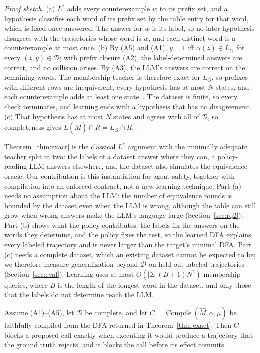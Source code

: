 \begin{proof}[Proof sketch]
(a) $L^*$ adds every counterexample $w$ to its prefix set, and a hypothesis classifies each word of its prefix set by the table entry for that word, which is fixed once answered. The answer for $w$ is its label, so no later hypothesis disagrees with the trajectories whose word is $w$, and each distinct word is a counterexample at most once.
(b) By (A5) and (A1), $y=1$ iff $\alpha(z)\in L_G$ for every $(z,y)\in\mathcal{D}$; with prefix closure (A2), the label-determined answers are correct, and no collision arises. By (A3), the LLM's answers are correct on the remaining words. The membership teacher is therefore exact for $L_G$, so prefixes with different rows are inequivalent, every hypothesis has at most $N$ states, and each counterexample adds at least one state~\cite{angluin1987learning}. The dataset is finite, so every check terminates, and learning ends with a hypothesis that has no disagreement.
(c) That hypothesis has at most $N$ states and agrees with all of $\mathcal{D}$, so completeness gives $L(\widehat M)\cap R=L_G\cap R$.
\end{proof}

Theorem~\ref{thm:exact} is the classical $L^*$ argument with the minimally adequate teacher split in two: the labels of a dataset answer where they can, a policy-reading LLM answers elsewhere, and the dataset also simulates the equivalence oracle. Our contribution is this instantiation for agent safety, together with compilation into an enforced contract, not a new learning technique. Part (a) needs no assumption about the LLM: the number of equivalence rounds is bounded by the dataset even when the LLM is wrong, although the table can still grow when wrong answers make the LLM's language large (Section~\ref{sec:rq2}). Part (b) shows what the policy contributes: the labels fix the answers on the words they determine, and the policy fixes the rest, so the learned DFA explains every labeled trajectory and is never larger than the target's minimal DFA. Part (c) needs a complete dataset, which an existing dataset cannot be expected to be; we therefore measure generalization beyond $\mathcal{D}$ on held-out labeled trajectories (Section~\ref{sec:eval}). Learning uses at most $O(|\Sigma|(B+1)N^2)$ membership queries, where $B$ is the length of the longest word in the dataset, and only those that the labels do not determine reach the LLM.

\begin{corollary}\label{cor:enforce}
Assume (A1)--(A5), let $\mathcal{D}$ be complete, and let $C=\operatorname{Compile}(\widehat M,\alpha,\mu)$ be faithfully compiled from the DFA returned in Theorem~\ref{thm:exact}. Then $C$ blocks a proposed call exactly when executing it would produce a trajectory that the ground truth rejects, and it blocks the call before its effect commits.
\end{corollary}

